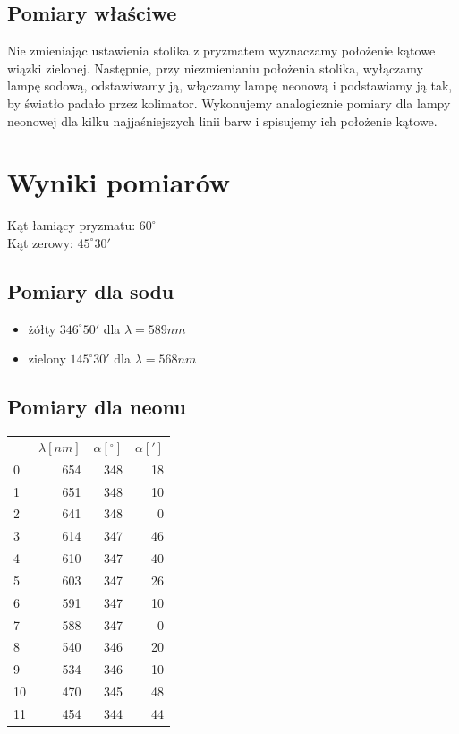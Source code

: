 \documentclass[a4paper,10pt]{article}
\begin{document}
\subsection{Pomiary właściwe}
Nie zmieniając ustawienia stolika z pryzmatem wyznaczamy położenie kątowe wiązki zielonej. Następnie, przy niezmienianiu położenia stolika, wyłączamy lampę sodową, odstawiwamy ją, włączamy lampę neonową i podstawiamy ją tak, by światło padało przez kolimator. Wykonujemy analogicznie pomiary dla lampy neonowej dla kilku najjaśniejszych linii barw i spisujemy ich położenie kątowe.

\section{Wyniki pomiarów}
Kąt łamiący pryzmatu: $60^\circ$
\\Kąt zerowy: $45^\circ 30'$
\subsection{Pomiary dla sodu}
\begin{itemize}
  \item żółty $346^\circ 50'$ dla $\lambda = 589 nm$ 
  \item zielony $145^\circ 30'$ dla $\lambda = 568 nm$ 
\end{itemize}
\subsection{Pomiary dla neonu}
\begin{tabular}{lrrr}
{} &  $\lambda[nm]$ &  $\alpha[^\circ]$ &  $\alpha[']$ \\
0  &         654 &          348 &          18 \\
1  &         651 &          348 &          10 \\
2  &         641 &          348 &           0 \\
3  &         614 &          347 &          46 \\
4  &         610 &          347 &          40 \\
5  &         603 &          347 &          26 \\
6  &         591 &          347 &          10 \\
7  &         588 &          347 &           0 \\
8  &         540 &          346 &          20 \\
9  &         534 &          346 &          10 \\
10 &         470 &          345 &          48 \\
11 &         454 &          344 &          44 \\
\end{tabular}
\end{document}
